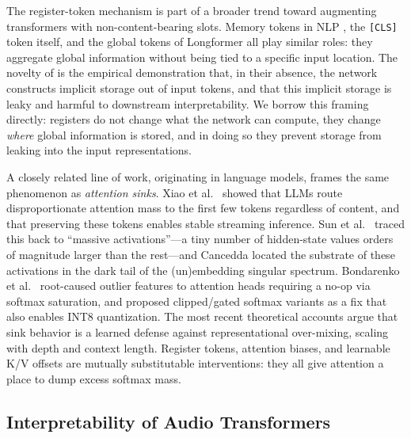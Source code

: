 \documentclass[conference]{IEEEtran}
\begin{document}
The register-token mechanism is part of a broader trend toward augmenting transformers with non-content-bearing slots. Memory tokens in NLP \cite{burtsev2020memory}, the \texttt{[CLS]} token itself, and the global tokens of Longformer \cite{beltagy2020longformer} all play similar roles: they aggregate global information without being tied to a specific input location. The novelty of \cite{darcet2024need} is the empirical demonstration that, in their absence, the network constructs implicit storage out of input tokens, and that this implicit storage is leaky and harmful to downstream interpretability. We borrow this framing directly: registers do not change what the network can compute, they change \emph{where} global information is stored, and in doing so they prevent storage from leaking into the input representations.

A closely related line of work, originating in language models, frames the same phenomenon as \emph{attention sinks}. Xiao et al.\ \cite{xiao2024streaming} showed that LLMs route disproportionate attention mass to the first few tokens regardless of content, and that preserving these tokens enables stable streaming inference. Sun et al.\ \cite{sun2024massive} traced this back to ``massive activations''---a tiny number of hidden-state values orders of magnitude larger than the rest---and Cancedda \cite{cancedda2024spectral} located the substrate of these activations in the dark tail of the (un)embedding singular spectrum. Bondarenko et al.\ \cite{bondarenko2023quantizable} root-caused outlier features to attention heads requiring a no-op via softmax saturation, and proposed clipped/gated softmax variants as a fix that also enables INT8 quantization. The most recent theoretical accounts \cite{gu2025emergence,barbero2025firsttoken} argue that sink behavior is a learned defense against representational over-mixing, scaling with depth and context length. Register tokens, attention biases, and learnable K/V offsets are mutually substitutable interventions: they all give attention a place to dump excess softmax mass.

\subsection{Interpretability of Audio Transformers}
\end{document}
